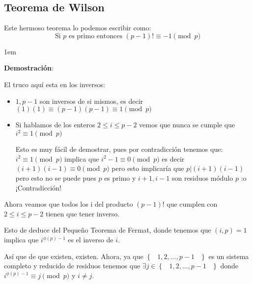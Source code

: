 \documentclass[12pt, fleqn]{report}                             %
\newenvironment{SmallIndentation}[1][0.75em]                    %
    {\begin{adjustwidth}{#1}{}\begin{footnotesize}}                 %
    {\end{footnotesize}\end{adjustwidth}}                           %
\DeclareMathOperator \Space {\quad}                             %
\DeclareMathOperator \MiniSpace {\;}                            %
\newcommand{\Set}[1]{\left\{ \MiniSpace #1 \MiniSpace \right\}} %
\begin{document}
        \subsection{Teorema de Wilson}

            Este hermoso teorema lo podemos escribir como:
            \begin{equation}
                \text{Si $p$ es primo entonces } (p-1)! \equiv -1 \pmod{p}
            \end{equation}


            \begin{SmallIndentation}[1em]
                \textbf{Demostración}:

                El truco aquí esta en los inversos:

                \begin{itemize}
                    \item $1, p-1$ son inversos de si mismos, es decir
                        $(1)(1) \equiv (p-1)(p-1) \equiv 1 \pmod{p}$

                    \item Si hablamos de los enteros $2 \leq i \leq p-2$ vemos que 
                        nunca se cumple que $i^2 \equiv 1 \pmod{p}$

                        Esto es muy fácil de demostrar, pues por contradicción tenemos
                        que: $i^2 \equiv 1 \pmod{p}$ implica que $i^2 - 1\equiv 0 \pmod{p}$
                        es decir $(i+1)(i-1) \equiv 0 \pmod{p}$ pero esto implicaría que
                        $p | (i+1)(i-1)$ pero esto no se puede pues $p$ es primo y 
                        $i+1, i-1$ son residuos módulo $p$ :o ¡Contradicción!

                \end{itemize}


                Ahora veamos que todos los i del producto $(p-1)!$ que cumplen
                con $2 \leq i \leq p-2$ tienen que tener inverso.

                Esto de deduce del Pequeño Teorema de Fermat, donde tenemos
                que $(i, p) = 1$ implica que $i^{\phi(p)-1}$ es el inverso de $i$.

                Así que de que existen, existen.
                Ahora, ya que $\Set{1, 2, \dots, p-1}$ es un sistema completo y reducido
                de residuos tenemos que $\exists j \in \Set{1, 2, \dots, p-1}$ donde
                $i^{\phi(p)-1} \equiv j \pmod{p}$ y $i \neq j$.


\end{SmallIndentation}
\end{document}
